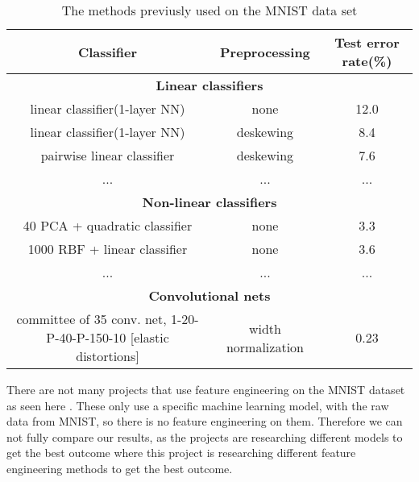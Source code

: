 \begin{table}[htb!]
  \centering
  \resizebox{1\textwidth}{!}
  {
    \begin{tabular}{|c|c|c|}
      \hline
      Classifier                                                          & Preprocessing       & Test error rate(\%) \\
      \hline
      \multicolumn{3}{|c|}{\textbf{Linear classifiers}}                                                               \\
      \hline
      linear classifier(1-layer NN)                                       & none                & 12.0                \\
      linear classifier(1-layer NN)                                       & deskewing           & 8.4                 \\
      pairwise linear classifier                                          & deskewing           & 7.6                 \\
      \hline
      ...                                                                 & ...                 & ...                 \\
      \hline
      \multicolumn{3}{|c|}{\textbf{Non-linear classifiers}}                                                           \\
      \hline
      40 PCA + quadratic classifier                                       & none                & 3.3                 \\
      1000 RBF + linear classifier                                        & none                & 3.6                 \\
      \hline
      ...                                                                 & ...                 & ...                 \\
      \hline
      \multicolumn{3}{|c|}{\textbf{Convolutional nets}}                                                               \\
      \hline
      committee of 35 conv. net, 1-20-P-40-P-150-10 [elastic distortions] & width normalization & 0.23                \\
      \hline
    \end{tabular}
  }
  \caption{The methods previusly used on the MNIST data set}
  \label{tab:method-MNIST}
\end{table}


There are not many projects that use feature engineering on the MNIST dataset as seen here \cite{Stochastic-optimization-neural-networks-assiri, BYERLY2021545, convolutional-neural-networks-convnets, Multi-column-neural-network-ciregan, WaveMix-jeevan}. These only use a specific machine learning model, with the raw data from MNIST, so there is no feature engineering on them. Therefore we can not fully compare our results, as the projects are researching different models to get the best outcome where this project is researching different feature engineering methods to get the best outcome.

